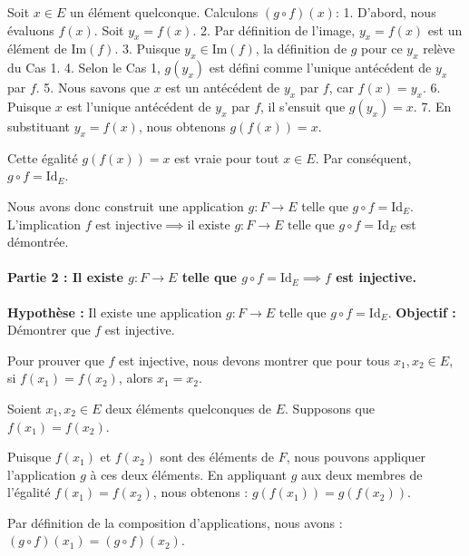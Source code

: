 \documentclass[12pt,a4paper]{report}
\begin{document}
Soit \(x \in E\) un élément quelconque. Calculons \((g \circ f)(x)\): 1.
D'abord, nous évaluons \(f(x)\). Soit \(y_x = f(x)\). 2. Par définition
de l'image, \(y_x = f(x)\) est un élément de \(\text{Im}(f)\). 3.
Puisque \(y_x \in \text{Im}(f)\), la définition de \(g\) pour ce \(y_x\)
relève du Cas 1. 4. Selon le Cas 1, \(g(y_x)\) est défini comme l'unique
antécédent de \(y_x\) par \(f\). 5. Nous savons que \(x\) est un
antécédent de \(y_x\) par \(f\), car \(f(x) = y_x\). 6. Puisque \(x\)
est l'unique antécédent de \(y_x\) par \(f\), il s'ensuit que
\(g(y_x) = x\). 7. En substituant \(y_x = f(x)\), nous obtenons
\(g(f(x)) = x\).

Cette égalité \(g(f(x)) = x\) est vraie pour tout \(x \in E\). Par
conséquent, \(g \circ f = \text{Id}_E\).

Nous avons donc construit une application \(g: F \to E\) telle que
\(g \circ f = \text{Id}_E\). L'implication
\(f \text{ est injective} \implies \text{il existe } g: F \to E \text{ telle que } g \circ f = \text{Id}_E\)
est démontrée.

\paragraph{\texorpdfstring{Partie 2 : Il existe \(g: F \to E\) telle que
\(g \circ f = \text{Id}_E \implies f\) est
injective.}{Partie 2 : Il existe g: F \textbackslash to E telle que g \textbackslash circ f = \textbackslash text\{Id\}\_E \textbackslash implies f est injective.}}\label{partie-2-il-existe-g-f-to-e-telle-que-g-circ-f-textid_e-implies-f-est-injective.}

\textbf{Hypothèse :} Il existe une application \(g: F \to E\) telle que
\(g \circ f = \text{Id}_E\). \textbf{Objectif :} Démontrer que \(f\) est
injective.

Pour prouver que \(f\) est injective, nous devons montrer que pour tous
\(x_1, x_2 \in E\), si \(f(x_1) = f(x_2)\), alors \(x_1 = x_2\).

Soient \(x_1, x_2 \in E\) deux éléments quelconques de \(E\). Supposons
que \(f(x_1) = f(x_2)\).

Puisque \(f(x_1)\) et \(f(x_2)\) sont des éléments de \(F\), nous
pouvons appliquer l'application \(g\) à ces deux éléments. En appliquant
\(g\) aux deux membres de l'égalité \(f(x_1) = f(x_2)\), nous obtenons :
\(g(f(x_1)) = g(f(x_2))\).

Par définition de la composition d'applications, nous avons :
\((g \circ f)(x_1) = (g \circ f)(x_2)\).
\end{document}
